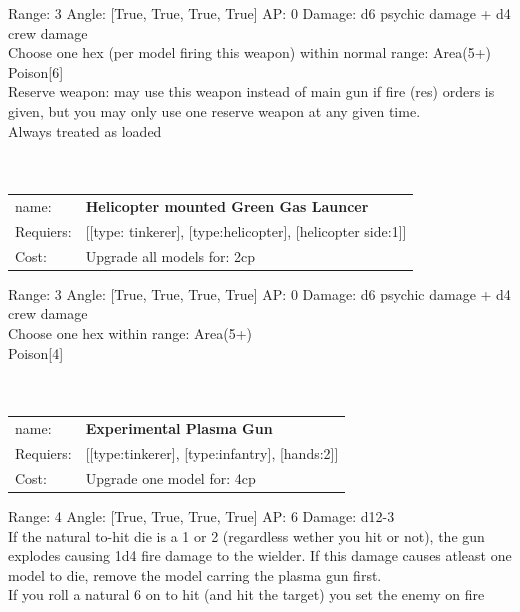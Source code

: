 Range: 3  Angle: [True, True, True, True] AP: 0 Damage: d6 psychic damage + d4 crew damage \\
Choose one hex (per model firing this weapon) within normal range: Area(5+)\\ 
Poison[6]\\ 
Reserve weapon: may use this weapon instead of main gun if fire (res) orders is given, but you may only use one reserve weapon at any given time.\\ 
Always treated as loaded\\ 








\ \\
\ \\
\begin{tabular}{ll}
name: & {\bf Helicopter mounted Green Gas Launcer } \\
Requiers: & [[type: tinkerer], [type:helicopter], [helicopter side:1]] \\
Cost: & Upgrade all models for: 2cp \\
\end{tabular}



Range: 3  Angle: [True, True, True, True] AP: 0 Damage: d6 psychic damage + d4 crew damage \\
Choose one hex within range: Area(5+)\\ 
Poison[4]\\ 








\ \\
\ \\
\begin{tabular}{ll}
name: & {\bf Experimental Plasma Gun } \\
Requiers: & [[type:tinkerer], [type:infantry], [hands:2]] \\
Cost: & Upgrade one model for: 4cp \\
\end{tabular}



Range: 4  Angle: [True, True, True, True] AP: 6 Damage: d12-3 \\
If the natural to-hit die is a 1 or 2 (regardless wether you hit or not), the gun explodes causing 1d4 fire damage to the wielder. If this damage causes atleast one model to die, remove the model carring the plasma gun first.\\ 
If you roll a natural 6 on to hit (and hit the target) you set the enemy on fire\\ 








